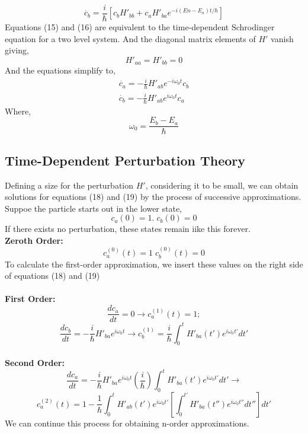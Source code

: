 \begin{equation}
	\dot{c_b}=\frac{i}{\hbar}[c_bH'_{bb}+c_aH'_{ba }e^{-i(En-E_a)t/\hbar}]
\end{equation}
Equations (15) and (16) are equivalent to the time-dependent Schrodinger equation for a two level system. And the diagonal matrix elements of $H'$ vanish giving,
\begin{equation}
	H'_{aa}=H'_{bb}=0
\end{equation}
And the equations simplify to,
\begin{align}
	\dot{c_a}=-\frac{i}{\hbar}H'_{ab}e^{-i\omega_0t}c_b \\
	\dot{c_b}=-\frac{i}{\hbar}H'_{ab}e^{i\omega_0t}c_a
\end{align}
Where,
\begin{equation*}
	\omega_0=\frac{E_b-E_a}{\hbar}
\end{equation*}

\subsection{Time-Dependent Perturbation Theory}
Defining a size for the perturbation $H'$, considering it to be small, we can obtain solutions for equations (18) and (19) by the process of successive approximations.\\
Suppoe the particle starts out in the lower state,
\begin{equation}
	c_a(0)=1. \; c_b(0)=0
\end{equation}
If there exists no perturbation, these states remain iike this forever.\\

\textbf{Zeroth Order:} \\
\begin{equation}
	c^{(0)}_a(t)=1 \; c^{(0)}_b(t)=0
\end{equation}
To calculate the first-order approximation, we insert these values on the right side of equations (18) and (19)\\
\\
\textbf{First Order:} \\
\begin{equation*}
	\frac{dc_a}{dt}=0 \rightarrow c^{(1)}_a(t)=1;
\end{equation*}	
\begin{equation}
	\frac{dc_b}{dt}=-\frac{i}{\hbar}H'_{ba}e^{i\omega_0t}\rightarrow c^{(1)}_b=\frac{i}{\hbar}\int_{0}^{t}H'_{ba}(t')e^{i\omega_0t'}dt'
\end{equation}
\\
\textbf{Second Order:}\\
\begin{equation*}
	\frac{dc_a}{dt}=-\frac{i}{\hbar}H'_{ba}e^{i\omega_0t}\left(\frac{i}{\hbar}\right)\int_{0}^{t}H'_{ba}(t')e^{i\omega_0t'}dt'\rightarrow
\end{equation*}
\begin{equation}
	c^{(2)}_a(t)=1-\frac{1}{\hbar}\int_{0}^{t}H'_{ab}(t')e^{i\omega_0t'}\left[\int_{0}^{t'}H'_{ba}(t'')e^{i\omega_0t''}dt''\right]dt'
\end{equation}
We can continue this process for obtaining n-order approximations.

